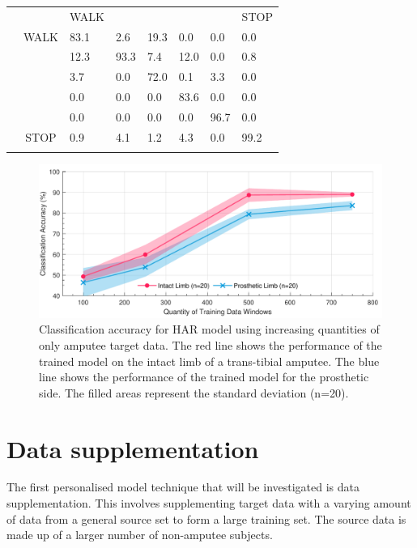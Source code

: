 \begin{table}[!hbt]
\begin{subtable}{\textwidth}
\begin{tabularx}{\textwidth}{ccYYYYYY}
         \hline
         & & WALK &  &  &  &  & STOP \\
         & WALK               & 83.1 & 2.6 & 19.3 & 0.0 & 0.0 & 0.0 \\
         &  & 12.3 & 93.3 & 7.4 & 12.0 & 0.0 & 0.8 \\
         &  & 3.7 & 0.0 & 72.0 & 0.1 & 3.3 & 0.0 \\
         &  & 0.0 & 0.0 & 0.0 & 83.6 & 0.0 & 0.0 \\
         &  & 0.0 & 0.0 & 0.0 & 0.0 & 96.7 & 0.0 \\
         & STOP               & 0.9 & 4.1 & 1.2 & 4.3 & 0.0 & 99.2 \\
    \end{tabularx}
    \end{subtable}
\end{table}

\begin{figure}[H]
    \centering
    \includegraphics[width=\textwidth]{content/6-Amputee/ch6_baseline_model_accuracy.pdf}
    \caption[Classification accuracy for HAR model using increasing quantities of only amputee target data]{Classification accuracy for HAR model using increasing quantities of only amputee target data. The red line shows the performance of the trained model on the intact limb of a trans-tibial amputee. The blue line shows the performance of the trained model for the prosthetic side. The filled areas represent the standard deviation (n=20).}
    \label{fig:ch6-amputee-baseline-bespoke-model}
\end{figure}


\section{Data supplementation} %
\label{sec:amputee-supplementation}
The first personalised model technique that will be investigated is data supplementation. This involves supplementing target data with a varying amount of data from a general source set to form a large training set. The source data is made up of a larger number of non-amputee subjects. 

